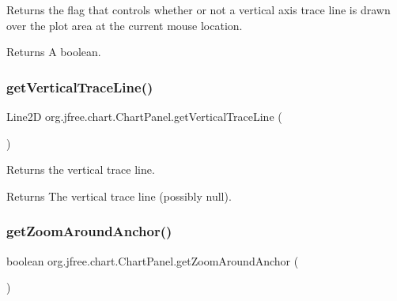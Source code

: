 Returns the flag that controls whether or not a vertical axis trace line is drawn over the plot area at the current mouse location.

\begin{DoxyReturn}{Returns}
A boolean. 
\end{DoxyReturn}
\mbox{\label{classorg_1_1jfree_1_1chart_1_1_chart_panel_a59afa34b7ced440adb2c7a5a2a668f02}} 
\subsubsection{\texorpdfstring{get\+Vertical\+Trace\+Line()}{getVerticalTraceLine()}}
{\footnotesize\ttfamily Line2D org.\+jfree.\+chart.\+Chart\+Panel.\+get\+Vertical\+Trace\+Line (\begin{DoxyParamCaption}{ }\end{DoxyParamCaption})\hspace{0.3cm}{\ttfamily [protected]}}

Returns the vertical trace line.

\begin{DoxyReturn}{Returns}
The vertical trace line (possibly {\ttfamily null}). 
\end{DoxyReturn}
\mbox{\label{classorg_1_1jfree_1_1chart_1_1_chart_panel_a6065bf6f61e0af4aafccc420853332a6}} 
\subsubsection{\texorpdfstring{get\+Zoom\+Around\+Anchor()}{getZoomAroundAnchor()}}
{\footnotesize\ttfamily boolean org.\+jfree.\+chart.\+Chart\+Panel.\+get\+Zoom\+Around\+Anchor (\begin{DoxyParamCaption}{ }\end{DoxyParamCaption})}

